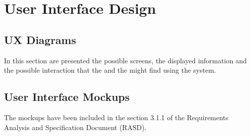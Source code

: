 \documentclass[../DD.tex]{subfiles}
\begin{document}
\chapter{User Interface Design}
\thispagestyle{fancy}

\section{UX Diagrams\label{3.1}}
In this section are presented the possible screens, the displayed information and the possible interaction that the  and the  might find using the system.



\section{User Interface Mockups\label{3.2}}
The mockups have been included in the section 3.1.1 of the Requirements Analysis and Specification Document (RASD).	
\end{document}
